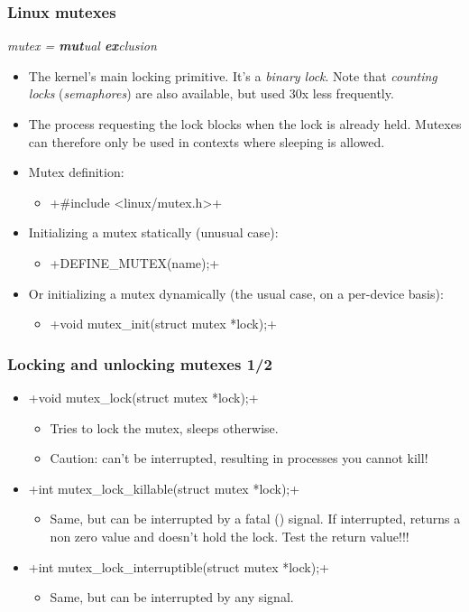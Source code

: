\begin{frame}[fragile]
  \frametitle{Linux mutexes}
  {\em mutex = {\bf mut}ual {\bf ex}clusion}
  \begin{itemize}
  \item The kernel's main locking primitive. It's a {\em binary lock}.
    Note that {\em counting locks} ({\em semaphores}) are also available,
    but used 30x less frequently.
  \item The process requesting the lock blocks when the lock is
    already held.  Mutexes can therefore only be used in contexts
    where sleeping is allowed.
  \item Mutex definition:
    \begin{itemize}
    \item {}+#include <linux/mutex.h>+
    \end{itemize}
  \item Initializing a mutex statically (unusual case):
    \begin{itemize}
    \item {}+DEFINE_MUTEX(name);+
    \end{itemize}
  \item Or initializing a mutex dynamically (the usual case, on a per-device basis):
    \begin{itemize}
    \item {}+void mutex_init(struct mutex *lock);+
    \end{itemize}
  \end{itemize}
\end{frame}

\begin{frame}[fragile]
  \frametitle{Locking and unlocking mutexes 1/2}
  \begin{itemize}
  \item {}+void mutex_lock(struct mutex *lock);+
    \begin{itemize}
    \item Tries to lock the mutex, sleeps otherwise.
    \item Caution: can't be interrupted, resulting in processes you
      cannot kill!
    \end{itemize}
  \item {}+int mutex_lock_killable(struct mutex *lock);+
    \begin{itemize}
    \item Same, but can be interrupted by a fatal () signal. If
      interrupted, returns a non zero value and doesn't hold the
      lock. Test the return value!!!
    \end{itemize}
  \item {}+int mutex_lock_interruptible(struct mutex *lock);+
    \begin{itemize}
    \item Same, but can be interrupted by any signal.
    \end{itemize}
  \end{itemize}
\end{frame}


